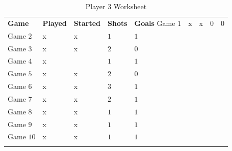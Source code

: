 \begin{table}[H]
	{\small
		\begin{longtable}{L{0.65in}C{0.45in}C{0.50in}C{0.40in}C{0.40in}} %
			\textbf{Game} & \textbf{Played} & \textbf{Started} & \textbf{Shots} & \textbf{Goals}\endhead
			Game $ 1  $ & x & x & $ 0 $ & $ 0 $ \\
			Game $ 2  $ & x & x & $ 1 $ & $ 1 $ \\
			Game $ 3  $ & x & x & $ 2 $ & $ 0 $ \\
			Game $ 4  $ & x &   & $ 1 $ & $ 1 $ \\
			Game $ 5  $ & x & x & $ 2 $ & $ 0 $ \\
			Game $ 6  $ & x & x & $ 3 $ & $ 1 $ \\
			Game $ 7  $ & x & x & $ 2 $ & $ 1 $ \\
			Game $ 8  $ & x & x & $ 1 $ & $ 1 $ \\
			Game $ 9  $ & x & x & $ 1 $ & $ 1 $ \\
			Game $ 10 $ & x & x & $ 1 $ & $ 1 $ \\
			\caption{Player 3 Worksheet}
			\label{06:tab05}
		\end{longtable}
	}
\end{table}

